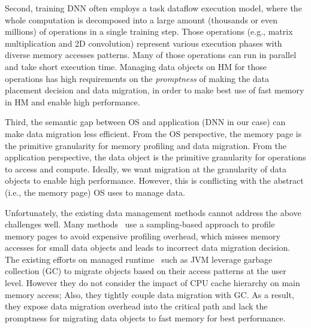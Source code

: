 
Second, training DNN often employs a task dataflow execution model, where the whole computation is decomposed into a large amount (thousands or even millions) of operations in a single training step. Those operations (e.g., matrix multiplication and 2D convolution) represent various execution phases with diverse memory accesses patterns. Many of those operations can run in parallel and take short execution time. Managing data objects on HM for those operations has high requirements on the \textit{promptness} of making the data placement decision and data migration, in order to make best use of fast memory in HM and enable high performance. 

Third, the semantic gap between OS and application (DNN in our case) can make data migration less efficient. From the OS perspective, the memory page is the primitive granularity for memory profiling and data migration. %
From the application perspective, the data object is the primitive granularity for operations to access and compute. Ideally, we want migration 
at the granularity of data objects to enable high performance. However, this is conflicting with the abstract (i.e., the memory page) OS uses to manage data. 

Unfortunately, the existing data management methods cannot address the above challenges well. Many methods~\cite{Thermostat:asplos17,RAMinate:socc16,heteros:isca17,sc18:wu,unimem:sc17} use a sampling-based approach to profile memory pages to avoid expensive profiling overhead, which misses memory accesses for small data objects and leads to incorrect data migration decision. %
\textcolor{check}{The existing efforts on managed runtime~\cite{pldi19:panthera, pldi18:KG,ASPLOS18:Espresso,sigmetrics19:crystalgazer} such as JVM leverage garbage collection (GC) to migrate objects based on their access patterns at the user level. However they do not consider the impact of CPU cache hierarchy on main memory access; Also, they tightly couple data migration with GC. As a result, they expose data migration overhead into the critical path and lack the promptness for migrating data objects to fast memory for best performance.}


